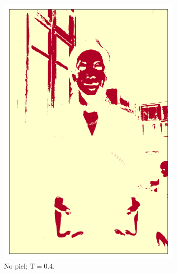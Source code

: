 \begin{figure}[ht!]
\begin{subfigure}[t]{0.2\textwidth}
        \includegraphics[width=\textwidth]{../figures/image2/image_02_treshbg_40percent.png}
        \caption{No piel; $\text{T} = 0.4$.}
    \end{subfigure}
    \hspace{0.25cm}
    \begin{subfigure}[t]{0.2\textwidth}
        \centering

\end{subfigure}
\end{figure}
